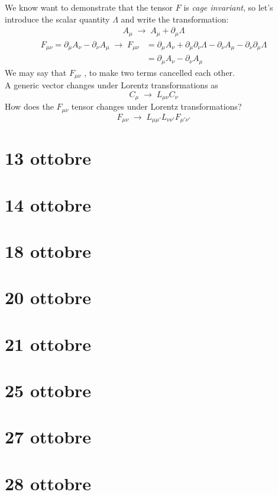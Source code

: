 \documentclass[class=article]{standalone}
\begin{document}
We know want to demonstrate that the tensor $F$ is \emph{cage invariant}, 
so let's introduce the scalar quantity $\Lambda$ and write the transformation:
\begin{equation*}
\begin{split}
A_{\mu} \;\longrightarrow\; A_{\mu} + \partial_{\mu} \Lambda
\end{split}
\end{equation*}
\begin{equation*}
\begin{split}
F_{\mu \nu} = \partial_{\mu} A_{\nu} - \partial_{\nu} A_{\mu}  \;\longrightarrow\; 
F_{\mu \nu} & =  \partial_{\mu} A_{\nu} + \partial_{\mu}\partial_{\nu} \Lambda - \partial_{\nu} A_{\mu} - \partial_{\nu}\partial_{\mu} \Lambda \\
& = \partial_{\mu} A_{\nu} - \partial_{\nu} A_{\mu} 
\end{split}
\end{equation*}
We may say that $F_{\mu \nu}$ , to make two terms cancelled each other. \\
A generic vector changes under Lorentz transformations as
\begin{equation*}
C_{\mu} \;\longrightarrow\; L_{\mu \nu} C_{\nu}
\end{equation*}
How does the $F_{\mu \nu}$ tensor changes under Lorentz transformations?
\begin{equation*}
F_{\mu \nu}  \;\longrightarrow\;   L_{\mu \mu'} L_{\nu \nu'}  F_{\mu' \nu'}
\end{equation*}

\newpage
\section{13 ottobre}


\newpage
\section{14 ottobre}


\newpage
\section{18 ottobre}


\newpage
\section{20 ottobre}


\newpage
\section{21 ottobre}


\newpage
\section{25 ottobre}


\newpage
\section{27 ottobre}






\newpage
\section{28 ottobre}
\end{document}
